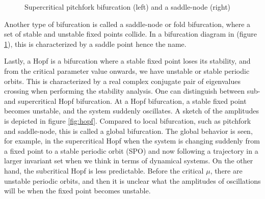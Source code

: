 \begin{figure}[ht]
\centering
\begin{subfigure}[t]{0.3\textwidth}
  \centering
\end{subfigure}
\hspace{0.1\textwidth}
\begin{subfigure}[t]{0.3\textwidth}
  \centering
\end{subfigure}
\caption{Supercritical pitchfork bifurcation (left) and a saddle-node (right)}
  \label{fig:pitch_saddle}
\end{figure}

Another type of bifurcation is called a saddle-node or fold bifurcation, where
a set of stable and unstable fixed points collide. In a bifurcation diagram in
(figure \ref{fig:pitch_saddle}), this is characterized by a saddle point hence
the name.

Lastly, a Hopf is a bifurcation where a stable fixed point loses its stability,
and from the critical parameter value onwards, we have unstable or stable
periodic orbits. This is characterized by a real complex conjugate pair of
eigenvalues crossing when performing the stability analysis. One can
distinguish between sub- and supercritical Hopf bifurcation. At a Hopf
bifurcation, a stable fixed point becomes unstable, and the system suddenly
oscillates. A sketch of the amplitudes is depicted in figure \ref{fig:hopf}.
Compared to local bifurcation, such as pitchfork and saddle-node, this is
called a global bifurcation. The global behavior is seen, for example, in the
supercritical Hopf when the system is changing suddenly from a fixed point to a
stable periodic orbit (SPO) and now following a trajectory in a larger
invariant set when we think in terms of dynamical systems. On the other hand,
the subcritical Hopf is less predictable. Before the critical $\mu$, there are
unstable periodic orbits, and then it is unclear what the amplitudes of
oscillations will be when the fixed point becomes unstable.

